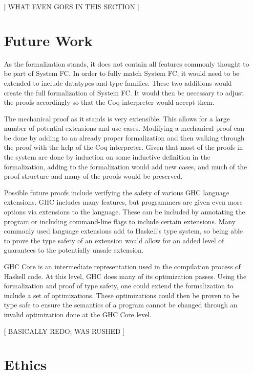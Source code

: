 \documentclass{sig-alternate}
\begin{document}
[ WHAT EVEN GOES IN THIS SECTION ]

\section{Future Work}
\label{sec:future-work}

As the formalization stands, it does not contain all features commonly thought to be part of System FC. In order to fully match System FC, it would need to be extended to include datatypes and type families. These two additions would create the full formalization of System FC. It would then be necessary to adjust the proofs accordingly so that the Coq interpreter would accept them.

The mechanical proof as it stands is very extensible. This allows for a large number of potential extensions and use cases. Modifying a mechanical proof can be done by adding to an already proper formalization and then walking through the proof with the help of the Coq interpreter. Given that most of the proofs in the system are done by induction on some inductive definition in the formalization, adding to the formalization would add new cases, and much of the proof structure and many of the proofs would be preserved.

Possible future proofs include verifying the safety of various GHC language extensions. GHC includes many features, but programmers are given even more options via extensions to the language. These can be included by annotating the program or including command-line flags to include certain extensions. Many commonly used language extensions add to Haskell's type system, so being able to prove the type safety of an extension would allow for an added level of guarantees to the potentially unsafe extension.

GHC Core is an intermediate representation used in the compilation process of Haskell code. At this level, GHC does many of its optimization passes. Using the formalization and proof of type safety, one could extend the formalization to include a set of optimizations. These optimizations could then be proven to be type safe to ensure the semantics of a program cannot be changed through an invalid optimization done at the GHC Core level.

[ BASICALLY REDO; WAS RUSHED ]

\section{Ethics}
\label{sec:ethics}
\end{document}
